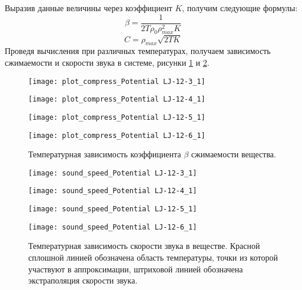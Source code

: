Выразив данные величины через коэффициент $K$, получим следующие формулы:
\begin{equation}
\beta = \frac{1}{2T\rho_0\rho_{max}^2K}
\label{eqBeta}
\end{equation}
\begin{equation}
C = \rho_{max}\sqrt{2TK}
\label{eqC}
\end{equation}
Проведя вычисления при различных температурах, получаем зависимость сжимаемости и скорости звука в системе, рисунки \ref{risBeta} и \ref{risC}.

\begin{figure}[h]
\begin{center}
\begin{minipage}[h]{0.45\linewidth}
\texttt{[image: plot\_compress\_Potential LJ-12-3\_1]}
\end{minipage}
\begin{minipage}[h]{0.45\linewidth}
\texttt{[image: plot\_compress\_Potential LJ-12-4\_1]}
\end{minipage}

\begin{minipage}[h]{0.45\linewidth}
\texttt{[image: plot\_compress\_Potential LJ-12-5\_1]}
\end{minipage}
\begin{minipage}[h]{0.45\linewidth}
\texttt{[image: plot\_compress\_Potential LJ-12-6\_1]}
\end{minipage}
\caption{Температурная зависимость коэффициента $\beta$ сжимаемости вещества.}
\label{risBeta}
\end{center}
\end{figure}


\begin{figure}[h]
\begin{center}
\begin{minipage}[h]{0.45\linewidth}
\texttt{[image: sound\_speed\_Potential LJ-12-3\_1]}
\end{minipage}
\begin{minipage}[h]{0.45\linewidth}
\texttt{[image: sound\_speed\_Potential LJ-12-4\_1]}
\end{minipage}

\begin{minipage}[h]{0.45\linewidth}
\texttt{[image: sound\_speed\_Potential LJ-12-5\_1]}
\end{minipage}
\begin{minipage}[h]{0.45\linewidth}
\texttt{[image: sound\_speed\_Potential LJ-12-6\_1]}
\end{minipage}
\caption{Температурная зависимость скорости звука в веществе. Красной сплошной линией обозначена область температуры, точки из которой участвуют в аппроксимации, штриховой линией обозначена экстраполяция скорости звука.}
\label{risC}
\end{center}
\end{figure}

